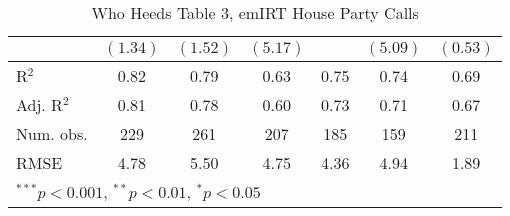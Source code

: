 \documentclass[12pt]{article}
\begin{document}
\begin{table}
\begin{center}
\begin{tabular}{l c c c c c c }
			& $(1.34)$      & $(1.52)$      & $(5.17)$      &                & $(5.09)$       & $(0.53)$      \\
			\hline
			R$^2$                       & 0.82          & 0.79          & 0.63          & 0.75           & 0.74           & 0.69          \\
			Adj. R$^2$                  & 0.81          & 0.78          & 0.60          & 0.73           & 0.71           & 0.67          \\
			Num. obs.                   & 229           & 261           & 207           & 185            & 159            & 211           \\
			RMSE                        & 4.78          & 5.50          & 4.75          & 4.36           & 4.94           & 1.89          \\
			\hline
			\multicolumn{7}{l}{\scriptsize{$^{***}p<0.001$, $^{**}p<0.01$, $^*p<0.05$}}
		\end{tabular}
		\caption{Who Heeds Table 3, emIRT House Party Calls}
	\end{center}
\end{table}
\end{document}
